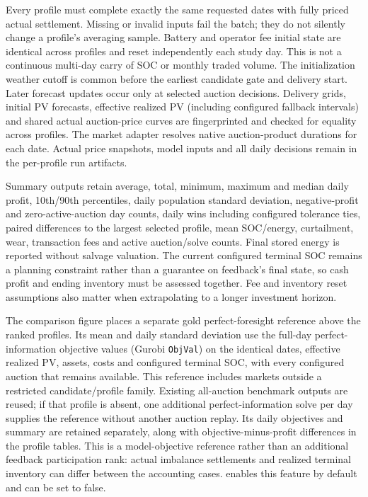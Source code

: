 \documentclass[11pt,a4paper]{article}
\begin{document}
Every profile must complete exactly the same requested dates with fully priced
actual settlement. Missing or invalid inputs fail the batch; they do not silently
change a profile's averaging sample. Battery and operator fee initial state are
identical across profiles and reset independently each study day. This is not a
continuous multi-day carry of SOC or monthly traded volume. The initialization
weather cutoff is common before the earliest candidate gate and delivery start.
Later forecast updates occur only at selected auction decisions. Delivery grids,
initial PV forecasts, effective realized PV (including configured fallback
intervals) and shared actual auction-price curves are fingerprinted and checked
for equality across profiles. The market adapter resolves native auction-product
durations for each date. Actual price snapshots, model inputs and all daily
decisions remain in the per-profile run artifacts.

Summary outputs retain average, total, minimum, maximum and median daily profit,
10th/90th percentiles, daily population standard deviation, negative-profit and
zero-active-auction day counts, daily wins including configured tolerance ties,
paired differences to the largest selected profile, mean SOC/energy, curtailment,
wear, transaction fees and active auction/solve counts. Final stored energy is
reported without salvage valuation. The current configured terminal SOC remains
a planning constraint rather than a guarantee on feedback's final state, so cash
profit and ending inventory must be assessed together. Fee and inventory reset
assumptions also matter when extrapolating to a longer investment horizon.

The comparison figure places a separate gold perfect-foresight reference above
the ranked profiles. Its mean and daily standard deviation use the full-day
perfect-information objective values (Gurobi \texttt{ObjVal}) on the identical
dates, effective realized PV, assets, costs and configured terminal SOC, with
every configured auction that remains available. This reference includes markets
outside a restricted candidate/profile family. Existing all-auction benchmark
outputs are reused; if that profile is absent, one additional perfect-information
solve per day supplies the reference without another auction replay. Its daily
objectives and summary are retained separately, along with objective-minus-profit
differences in the profile tables. This is a model-objective reference rather than
an additional feedback participation rank: actual imbalance settlements and
realized terminal inventory can differ between the accounting cases.
 enables this feature by
default and can be set to false.
\end{document}
